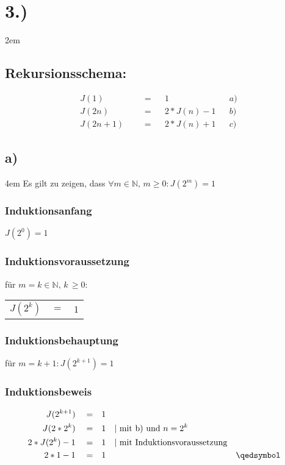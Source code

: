 \documentclass[titlepage]{article}
\begin{document}
		\newpage
		\section*{3.)}
		\begingroup
		\leftskip2em
		\subsection*{Rekursionsschema:}
			
			\begin{align*}
				J(1)&& &= &&1 &&a)\\
				J(2n)&& &= &&2*J(n)-1 &&b)\\
				J(2n+1)&& &= &&2*J(n)+1 &&c)	
			\end{align*}
		\endgroup
		
		\subsection*{a)}
			\begingroup
			\leftskip4em
			Es gilt zu zeigen, dass $\forall m \in \mathbb{N},\,m \ge 0 : J(2^m)=1$
			\subsubsection*{Induktionsanfang}
				$J(2^0)=1$
			\subsubsection*{Induktionsvoraussetzung}
				für $m=k \in \mathbb{N},\,k \,\ge 0 :$
				\begin{tabular}{lcc}
					$J(2^k)$ & $=$ & $1$ \\
				\end{tabular}
			\subsubsection*{Induktionsbehauptung}
				für $m=k+1 : J(2^{k+1})=1$
			\subsubsection*{Induktionsbeweis}

				\begin{align*}
					J(2^{k+1})&& &= && 1 \\
					J(2*2^k)&& &= && 1 && \text{| mit b) und }n=2^k\\
					2*J(2^k)-1&& &= && 1 && \text{| mit Induktionsvoraussetzung}\\
					2*1-1&& &= && 1 && &&\qedsymbol
				\end{align*}
			\endgroup
		
\end{document}
